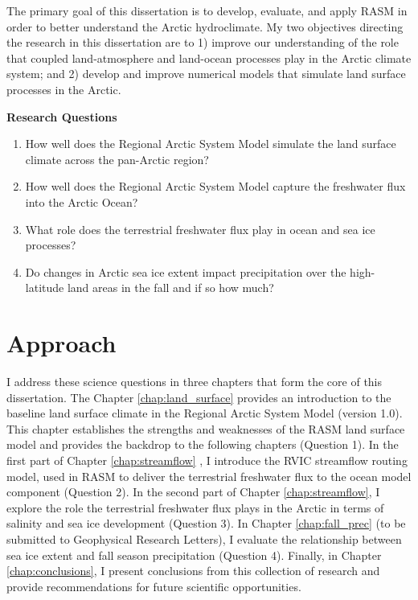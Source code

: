 The primary goal of this dissertation is to develop, evaluate, and apply RASM in order to better understand the Arctic hydroclimate.
My two objectives directing the research in this dissertation are to 1) improve our understanding of the role that coupled land-atmosphere and land-ocean processes play in the Arctic climate system; and 2) develop and improve numerical models that simulate land surface processes in the Arctic.

\clearpage
\begin{mdframed}
  {\bf Research Questions}
  \begin{enumerate}
    \item How well does the Regional Arctic System Model simulate the land surface climate across the pan-Arctic region?
    \item How well does the Regional Arctic System Model capture the freshwater flux into the Arctic Ocean?
    \item What role does the terrestrial freshwater flux play in ocean and sea ice processes?
    \item Do changes in Arctic sea ice extent impact precipitation over the high-latitude land areas in the fall and if so how much?
  \end{enumerate}
\end{mdframed}

\section{Approach}

I address these science questions in three chapters that form the core of this dissertation.
The Chapter \ref{chap:land_surface} \citep[published as ][]{Hamman_2016a} provides an introduction to the baseline land surface climate in the Regional Arctic System Model (version 1.0).
This chapter establishes the strengths and weaknesses of the RASM land surface model and provides the backdrop to the following chapters (Question 1).
In the first part of Chapter \ref{chap:streamflow} \citep{Hamman_2016b}, I introduce the RVIC streamflow routing model, used in RASM to deliver the terrestrial freshwater flux to the ocean model component (Question 2).
In the second part of Chapter \ref{chap:streamflow}, I explore the role the terrestrial freshwater flux plays in the Arctic in terms of salinity and sea ice development (Question 3).
In Chapter \ref{chap:fall_prec} (to be submitted to Geophysical Research Letters), I evaluate the relationship between sea ice extent and fall season precipitation (Question 4).
Finally, in Chapter \ref{chap:conclusions}, I present conclusions from this collection of research and provide recommendations for future scientific opportunities.
